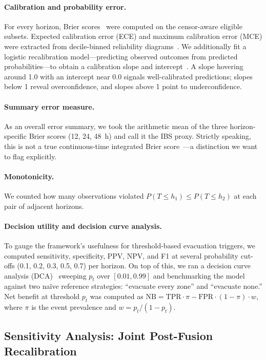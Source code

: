 \documentclass[fire,article,submit,pdftex]{../Definitions/mdpi}
\begin{document}
\paragraph{Calibration and probability error.}
For every horizon, Brier scores~\cite{Brier1950} were computed on the censor-aware eligible subsets.
Expected calibration error (ECE) and maximum calibration error (MCE) were extracted from decile-binned reliability diagrams~\cite{NiculescuMizil2005}.
We additionally fit a logistic recalibration model---predicting observed outcomes from predicted probabilities---to obtain a calibration slope and intercept~\cite{VanCalster2019}. A slope hovering around 1.0 with an intercept near 0.0 signals well-calibrated predictions; slopes below 1 reveal overconfidence, and slopes above 1 point to underconfidence.

\paragraph{Summary error measure.}
As an overall error summary, we took the arithmetic mean of the three horizon-specific Brier scores (12, 24, 48~h) and call it the IBS proxy.
Strictly speaking, this is not a true continuous-time integrated Brier score~\cite{Graf1999}---a distinction we want to flag explicitly.

\paragraph{Monotonicity.}
We counted how many observations violated $P(T \leq h_1) \leq P(T \leq h_2)$ at each pair of adjacent horizons.

\paragraph{Decision utility and decision curve analysis.}
To gauge the framework's usefulness for threshold-based evacuation triggers, we computed sensitivity, specificity, PPV, NPV, and F1 at several probability cut-offs (0.1, 0.2, 0.3, 0.5, 0.7) per horizon.
On top of this, we ran a decision curve analysis (DCA)~\cite{Vickers2006} sweeping $p_t$ over $[0.01, 0.99]$ and benchmarking the model against two na\"ive reference strategies: ``evacuate every zone'' and ``evacuate none.''
Net benefit at threshold $p_t$ was computed as $\text{NB} = \text{TPR} \cdot \pi - \text{FPR} \cdot (1 - \pi) \cdot w$, where $\pi$ is the event prevalence and $w = p_t / (1 - p_t)$.

\subsection{Sensitivity Analysis: Joint Post-Fusion Recalibration}\label{sec:recal}
\end{document}
